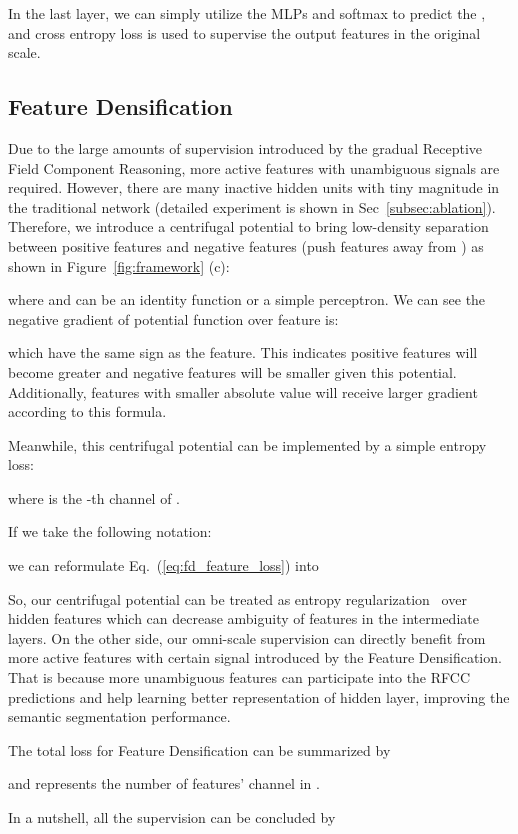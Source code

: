 \documentclass[final]{cvpr}
\begin{document}
In the last layer, we can simply utilize the MLPs and softmax to predict the , and cross entropy loss is used to supervise the output features in the original scale.


\subsection{Feature Densification}
\label{subsec:fd}
Due to the large amounts of supervision introduced by the gradual Receptive Field Component Reasoning, more active features with unambiguous signals are required. However, there are many inactive hidden units with tiny magnitude in the traditional network (detailed experiment is shown in Sec~\ref{subsec:ablation}). Therefore, we introduce a centrifugal potential to bring low-density separation between positive features and negative features (\ie push features away from ) as shown in Figure~\ref{fig:framework} (c):

where  and  can be an identity function or a simple perceptron. We can see the negative gradient of potential function over feature is:

which have the same sign as the feature. This indicates positive features will become greater and negative features will be smaller given this potential. Additionally, features with smaller absolute value will receive larger gradient according to this formula.

Meanwhile, this centrifugal potential can be implemented by a simple entropy loss:

where  is the -th channel of .

If we take the following notation:

we can reformulate Eq.~(\ref{eq:fd_feature_loss}) into


So, our centrifugal potential can be treated as entropy regularization~\cite{lee2013pseudo} over hidden features which can decrease ambiguity of features in the intermediate layers. On the other side, our omni-scale supervision can directly benefit from more active features with certain signal introduced by the Feature Densification. That is because more unambiguous features can participate into the RFCC predictions and help learning better representation of hidden layer, improving the semantic segmentation performance.

The total loss for Feature Densification can be summarized by

and  represents the number of features' channel in .

In a nutshell, all the supervision can be concluded by 
\end{document}
